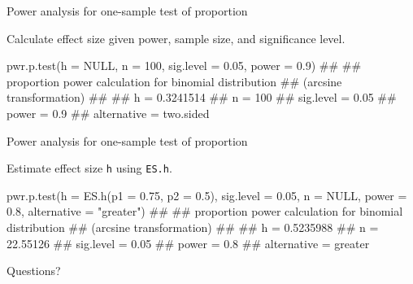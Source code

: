 \documentclass[12pt, t, xcolor=dvipsnames]{beamer}
\newcommand{\code}[1]{\colorbox{codegray}{\textcolor{black!95}{\texttt{#1}}}}
\begin{document}
\begin{frame}[fragile]{Power analysis for one-sample test of proportion}

Calculate effect size given power, sample size, and significance level.

\begin{Rcode}
pwr.p.test(h = NULL, n = 100, sig.level = 0.05, power = 0.9)
## 
##      proportion power calculation for binomial distribution 
##      (arcsine transformation) 
## 
##               h = 0.3241514
##               n = 100
##       sig.level = 0.05
##           power = 0.9
##     alternative = two.sided
\end{Rcode}

\end{frame}

\begin{frame}[fragile]{Power analysis for one-sample test of proportion}

Estimate effect size \code{h} using \code{ES.h}. 

\begin{Rcode}
pwr.p.test(h = ES.h(p1 = 0.75, p2 = 0.5), sig.level = 0.05, 
           n = NULL, power = 0.8, 
           alternative = "greater")
## 
##      proportion power calculation for binomial distribution 
##      (arcsine transformation) 
## 
##               h = 0.5235988
##               n = 22.55126
##       sig.level = 0.05
##           power = 0.8
##     alternative = greater
\end{Rcode}

\end{frame}

\begin{frame}[c]
  \large{Questions?}
\end{frame}


\appendix
\end{document}
